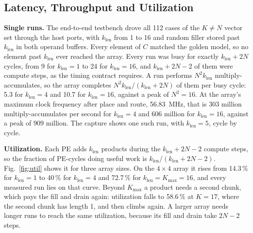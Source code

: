 
\subsection{Latency, Throughput and Utilization}
\textbf{Single runs.} The end-to-end testbench drove all 112 cases of the $K \neq N$ vector set through the host ports, with $k_{\mathrm{len}}$ from 1 to 16 and random filler stored past $k_{\mathrm{len}}$ in both operand buffers. Every element of $C$ matched the golden model, so no element past $k_{\mathrm{len}}$ ever reached the array. Every run was busy for exactly $k_{\mathrm{len}} + 2N$ cycles, from 9 for $k_{\mathrm{len}} = 1$ to 24 for $k_{\mathrm{len}} = 16$, and $k_{\mathrm{len}} + 2N - 2$ of them were compute steps, as the timing contract requires. A run performs $N^2 k_{\mathrm{len}}$ multiply-accumulates, so the array completes $N^2 k_{\mathrm{len}} / (k_{\mathrm{len}} + 2N)$ of them per busy cycle: 5.3 for $k_{\mathrm{len}} = 4$ and 10.7 for $k_{\mathrm{len}} = 16$, against a peak of $N^2 = 16$. At the array's maximum clock frequency after place and route, 56.83~MHz, that is 303 million multiply-accumulates per second for $k_{\mathrm{len}} = 4$ and 606 million for $k_{\mathrm{len}} = 16$, against a peak of 909 million. The capture  shows one such run, with $k_{\mathrm{len}} = 5$, cycle by cycle.

\textbf{Utilization.} Each PE adds $k_{\mathrm{len}}$ products during the $k_{\mathrm{len}} + 2N - 2$ compute steps, so the fraction of PE-cycles doing useful work is $k_{\mathrm{len}} / (k_{\mathrm{len}} + 2N - 2)$. Fig.~\ref{fig:util} shows it for three array sizes. On the $4 \times 4$ array it rises from 14.3\,\% for $k_{\mathrm{len}} = 1$ to 40\,\% for $k_{\mathrm{len}} = 4$ and 72.7\,\% for $k_{\mathrm{len}} = K_{\max} = 16$, and every measured run lies on that curve. Beyond $K_{\max}$ a product needs a second chunk, which pays the fill and drain again: utilization falls to 58.6\,\% at $K = 17$, where the second chunk has length 1, and then climbs again. A larger array needs longer runs to reach the same utilization, because its fill and drain take $2N - 2$ steps.

